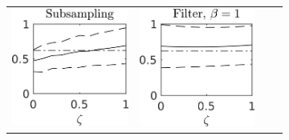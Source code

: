 \documentclass[10pt]{article}
\begin{document}
\begin{figure}[t]
	\vspace{0.5cm}
	\begin{subfigure}{\linewidth}
		\centering
		\begin{tabular}{cccc}
			\includegraphics[]{Figures/A2_sub_s10.png} & \includegraphics[]{Figures/A2_filt_s10_b1.png} &

\end{tabular}
\end{subfigure}
\end{figure}
\end{document}
